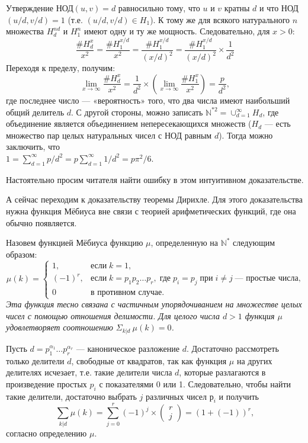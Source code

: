 \documentclass{mai_book}
\begin{document}
\begin{myproof}
Утверждение НОД$(u,v) = d$ равносильно тому, что $u$ и $v$ кратны
$d$ и что НОД$(u/d,v/d) = 1$ (т.е. $(u/d,v/d)\in H_{1}$). К тому же для
всякого натурального $n$ множества $H_{d}^{nd}$ и  $H_{1}^n$ имеют одну и ту же
мощность. Следовательно, для $x > 0$:
$$\frac{\#H_{d}^x}{x^2}=\frac{\#H_{1}^{x/d}}{x^2}=\frac{\#H_{1}^{x/d}}{(x/d)^2}=\frac{\#H_{1}^{x/d}}{(x/d)^2}\times\frac{1}{d^2}$$
Переходя к пределу, получим:
$$\lim\limits_{x\to\infty}\frac{\#H_{d}^x}{x^2}=\frac{1}{d^2}\times\left(\lim\limits_{x\to\infty}\frac{\#H_{1}^x}{x^2} \right) = \frac{p}{d^2},$$
где последнее число — «вероятность» того, что два числа имеют
наибольший общий делитель $d$. С другой стороны, можно запи­сать $\mathbb{N}^{*2}=\cup_{d=1}^{\infty}H_{d}$, где
 объединение является объединением непересекающихся множеств ($H_{d}$ — есть множество пар целых натуральных чисел с НОД равным $d$). Тогда можно заключить, что\\
$1 =\sum\nolimits_{d=1}^{\infty} p/d^2 = p\sum\nolimits_{d=1}^{\infty}1/d^2=p\pi^2/6$.
\end{myproof}

Настоятельно просим читателя найти ошибку в этом интуитивном
доказательстве.

А сейчас переходим к доказательству теоремы Дирихле. Для этого
доказательства нужна функция Мёбиуса вне связи с теорией арифме­тических функций, где она обычно появляется.

\begin{property}
\hspace*{0.5cm}Назовем функцией Мёбиуса функцию $\mu$, определенную на $\mathbb{N}^{*}$ следу­ющим образом:
$$\mu(k)=
\left\lbrace
\begin{array}{ll}
1,&\text{если}\;k=1,\\
(-1)^r,&\text{если}\;k=p_{1}p_{2}\ldots p_{r},\;\text{где}\;p_{i}=p_{j}\;\text{при}\;i\neq j\;\text{— простые числа,}\\
0&\text{в противном случае.}
\end{array}
\right.$$
\textit{Эта функция тесно связана с частичным упорядочиванием на множе­стве целых чисел с помощью отношения делимости. Для целого числа
$d>1$ функция $\mu$ удовлетворяет соотношению $\Sigma_{k|d}\:\mu(k)=0$.}
\end{property}
\begin{myproof}
Пусть $d=p_{1}^{\alpha_{1}}\ldots p_{r}^{\alpha_{r}}$
 — каноническое разложение $d$. Достаточно
рассмотреть только делители $d$, свободные от квадратов, так как
функция $\mu$ на других делителях исчезает, т.е. такие делители числа
$d$, которые разлагаются в произведение простых $p_{i}$ с показателями
0 или 1. Следовательно, чтобы найти такие делители, достаточно
выбрать $j$ различных чисел $р_{i}$ и получить
$$\sum\limits_{k|d}\mu(k)=\sum\limits_{j=0}^r(-1)^j\times
\begin{pmatrix}
r\\
j
\end{pmatrix}
=(1+(-1))^r,$$
согласно определению $\mu$.
\end{myproof}
\end{document}
